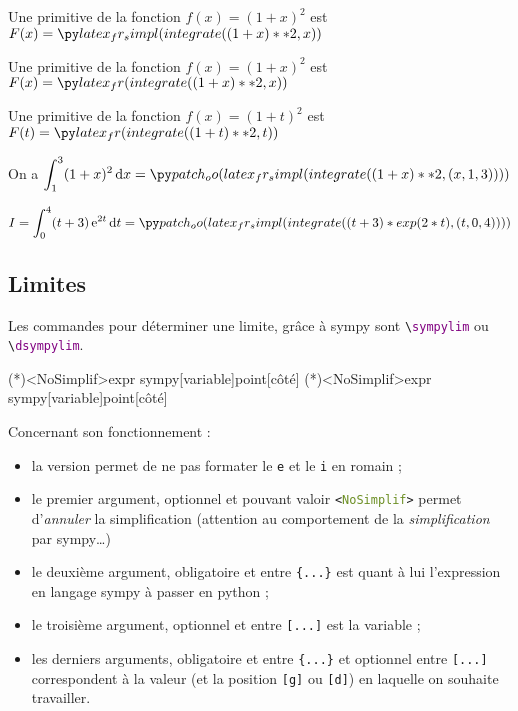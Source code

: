\documentclass[french,a4paper,11pt]{article}
\newcommand\Cle[1]{{\bfseries\sffamily\textlangle #1\textrangle}}
\begin{document}
\begin{bloctext}
Une primitive de la fonction $f(x)=(1+x)^2$ est $F(x) = \dsympyprim{(1+x)**2}$

Une primitive de la fonction $f(x)=(1+x)^2$ est $F(x) = \dsympyprim<NoSimplif>{(1+x)**2}$

Une primitive de la fonction $f(x)=(1+t)^2$ est $F(t) = \dsympyprim<NoSimplif>{(1+t)**2}[t]$
\end{bloctext}

\begin{bloctext}
On a $\displaystyle\int_1^3 (1+x)^2\,\text{d}x = \dsympyintegr{(1+x)**2}{1}{3}$

$I=\displaystyle\int_0^{4} (t+3)\,\e^{2t}\,\text{d}t = \dsympyintegr{(t+3)*exp(2*t)}[t]{0}{4}$
\end{bloctext}

\subsection{Limites}

\begin{cautionblock}
Les commandes pour déterminer une limite, grâce à \textsf{sympy} sont \texttt{\textbackslash \textcolor{purple}{sympylim}} ou \texttt{\textbackslash \textcolor{purple}{dsympylim}}.

\end{cautionblock}

\begin{bloctext}
\sympylim(*)<NoSimplif>{expr sympy}[variable]{point}[côté]
\dsympylim(*)<NoSimplif>{expr sympy}[variable]{point}[côté]
\end{bloctext}

\begin{tipblock}
Concernant son fonctionnement :

\begin{itemize}
	\item la version \Cle{*} permet de ne pas formater le \texttt{e} et le \texttt{i} en \textsf{romain} ;
	\item le premier argument, optionnel et pouvant valoir \texttt{<\textcolor{OliveDrab}{NoSimplif}>} permet d'\textit{annuler} la simplification (attention au comportement de la \textit{simplification} par \textsf{sympy}\ldots)
	\item le deuxième argument, obligatoire et entre \texttt{\{...\}} est quant à lui l'expression en langage \textsf{sympy} à passer en \textsf{python} ;
	\item le troisième argument, optionnel et entre \texttt{[...]} est la variable ;
	\item les derniers arguments, obligatoire et entre \texttt{\{...\}} et optionnel entre \texttt{[...]} correspondent à la valeur (et la position \texttt{[g]} ou \texttt{[d]}) en laquelle on souhaite travailler.
\end{itemize}
\vspace*{-\baselineskip}\leavevmode
\end{tipblock}
\end{document}
